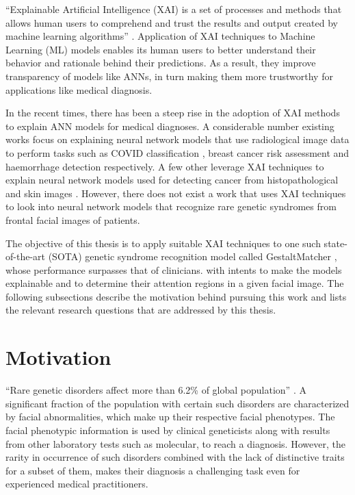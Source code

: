 \documentclass[../report.tex]{subfiles}
\begin{document}
	\enquote{Explainable Artificial Intelligence (XAI) is a set of processes and methods that allows human users to comprehend and trust the results and output created by machine learning algorithms} \cite{BibEntry2021Mar}. Application of XAI techniques to Machine Learning (ML) models enables its human users to better understand their behavior and rationale behind their predictions. As a result, they improve transparency of models like ANNs, in turn making them more trustworthy for applications like medical diagnosis.
	
	In the recent times, there has been a steep rise in the adoption of XAI methods to explain ANN models for medical diagnoses. A considerable number existing works focus on explaining neural network models that use radiological image data to perform tasks such as COVID classification \cite{ghoshal2020estimating}, breast cancer risk assessment \cite{qian2021prospective} and haemorrhage detection \cite{lee2019explainable} respectively. A few other leverage XAI techniques to explain neural network models used for detecting cancer from histopathological \cite{binder2021morphological} and skin images \cite{nunnari2021overlap}. However, there does not exist a work that uses XAI techniques to look into neural network models that recognize rare genetic syndromes from frontal facial images of patients.
	
	The objective of this thesis is to apply suitable XAI techniques to one such state-of-the-art (SOTA) genetic syndrome recognition model called GestaltMatcher \cite{hsieh2022gestaltmatcher}, whose performance surpasses that of clinicians. with intents to make the models explainable and to determine their attention regions in a given facial image. The following subsections describe the motivation behind pursuing this work and lists the relevant research questions that are addressed by this thesis. 
	

    \section{Motivation}
    \enquote{Rare genetic disorders affect more than 6.2\% of global population} \cite{hsieh2022gestaltmatcher}. A significant fraction of the population with certain such disorders are characterized by facial abnormalities, which make up their respective facial phenotypes. The facial phenotypic information is used by clinical geneticists along with results from other laboratory tests such as molecular, to reach a diagnosis. However, the rarity in occurrence of such disorders combined with the lack of distinctive traits for a subset of them, makes their diagnosis a challenging task even for experienced medical practitioners.  
    
\end{document}
